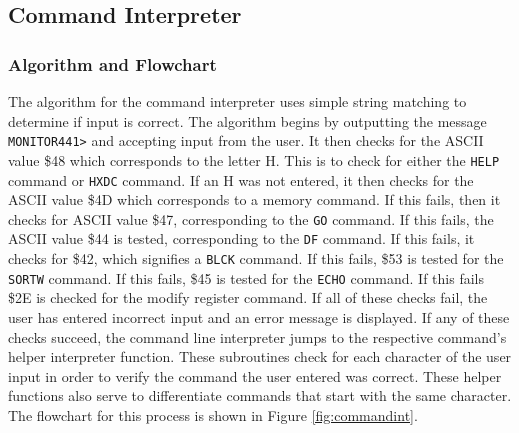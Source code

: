 \documentclass[12pt]{article}
\begin{document}
		\subsection{Command Interpreter}
			\subsubsection{Algorithm and Flowchart}
			The algorithm for the command interpreter uses simple string matching to determine if input is correct. The algorithm begins by outputting the message \texttt{MONITOR441>} and accepting input from the user. It then checks for the ASCII value \$48 which corresponds to the letter H. This is to check for either the \texttt{HELP} command or \texttt{HXDC} command. If an H was not entered, it then checks for the ASCII value \$4D which corresponds to a memory command. If this fails, then it checks for ASCII value \$47, corresponding to the \texttt{GO} command. If this fails, the ASCII value \$44 is tested, corresponding to the \texttt{DF} command. If this fails, it checks for \$42, which signifies a \texttt{BLCK} command. If this fails, \$53 is tested for the \texttt{SORTW} command. If this fails, \$45 is tested for the \texttt{ECHO} command. If this fails \$2E is checked for the modify register command. If all of these checks fail, the user has entered incorrect input and an error message is displayed. If any of these checks succeed, the command line interpreter jumps to the respective command's helper interpreter function. These subroutines check for each character of the user input in order to verify the command the user entered was correct. These helper functions also serve to differentiate commands that start with the same character. The flowchart for this process is shown in Figure \ref{fig:commandint}.
			
\end{document}
